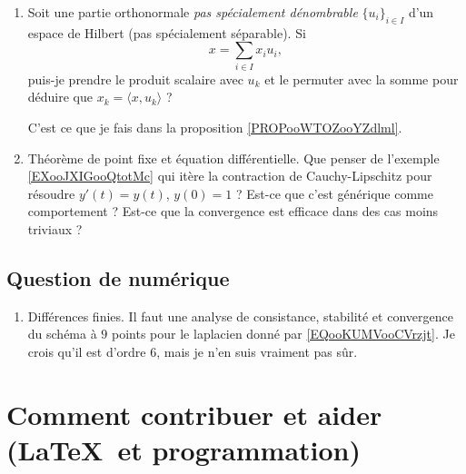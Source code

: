 \begin{enumerate}
    \item
        Soit une partie orthonormale \emph{pas spécialement dénombrable} \( \{ u_i \}_{i\in I}\) d'un espace de Hilbert (pas spécialement séparable). Si
        \begin{equation}
            x=\sum_{i\in I}x_iu_i,
        \end{equation}
        puis-je prendre le produit scalaire avec \( u_{k}\) et le permuter avec la somme pour déduire que \( x_k=\langle x, u_k\rangle \) ?

        C'est ce que je fais dans la proposition \ref{PROPooWTOZooYZdlml}. 
    \item 
        Théorème de point fixe et équation différentielle. Que penser de l'exemple \ref{EXooJXIGooQtotMc} qui itère la contraction de Cauchy-Lipschitz pour résoudre \( y'(t)=y(t)\), \( y(0)=1\) ? Est-ce que c'est générique comme comportement ? Est-ce que la convergence est efficace dans des cas moins triviaux ?
\end{enumerate}

\subsection{Question de numérique}

\begin{enumerate}
    \item
        Différences finies. Il faut une analyse de consistance, stabilité et convergence du schéma à \( 9\) points pour le laplacien donné par \eqref{EQooKUMVooCVrzjt}. Je crois qu'il est d'ordre \( 6\), mais je n'en suis vraiment pas sûr.
\end{enumerate}

\section{Comment contribuer et aider (\LaTeX\ et programmation)}


